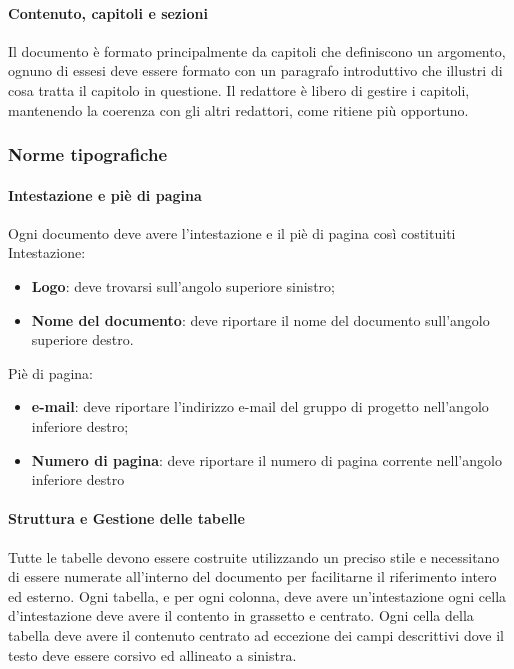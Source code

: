   \paragraph{Contenuto, capitoli e sezioni}
  Il documento è formato principalmente da capitoli che definiscono un argomento,
  ognuno di essesi deve essere formato con un paragrafo introduttivo che illustri
  di cosa tratta il capitolo in questione.
  Il redattore è libero di gestire i capitoli, mantenendo la coerenza con gli altri
  redattori, come ritiene più opportuno.
  \subsubsection{Norme tipografiche}
  \paragraph{Intestazione e piè di pagina}
  Ogni documento deve avere l'intestazione e il piè di pagina così costituiti
  Intestazione:
  \begin{itemize}
    \item \textbf{Logo}: deve trovarsi sull'angolo superiore sinistro;
    \item \textbf{Nome del documento}: deve riportare il nome del documento sull'angolo superiore destro.
  \end{itemize}
  Piè di pagina:
  \begin{itemize}
    \item \textbf{e-mail}: deve riportare l'indirizzo e-mail del gruppo di progetto
    nell'angolo inferiore destro;
    \item \textbf{Numero di pagina}: deve riportare il numero di pagina corrente
     nell'angolo inferiore destro
  \end{itemize}

  \paragraph{Struttura e Gestione delle tabelle}
  Tutte le tabelle devono essere costruite utilizzando un preciso stile e necessitano
  di essere numerate all'interno del documento per facilitarne il riferimento
  intero ed esterno.
  Ogni tabella, e per ogni colonna, deve avere un'intestazione ogni cella d'intestazione
  deve avere il contento in grassetto e centrato.
  Ogni cella della tabella deve avere il contenuto centrato ad eccezione dei campi
  descrittivi dove il testo deve essere corsivo ed allineato a sinistra.
